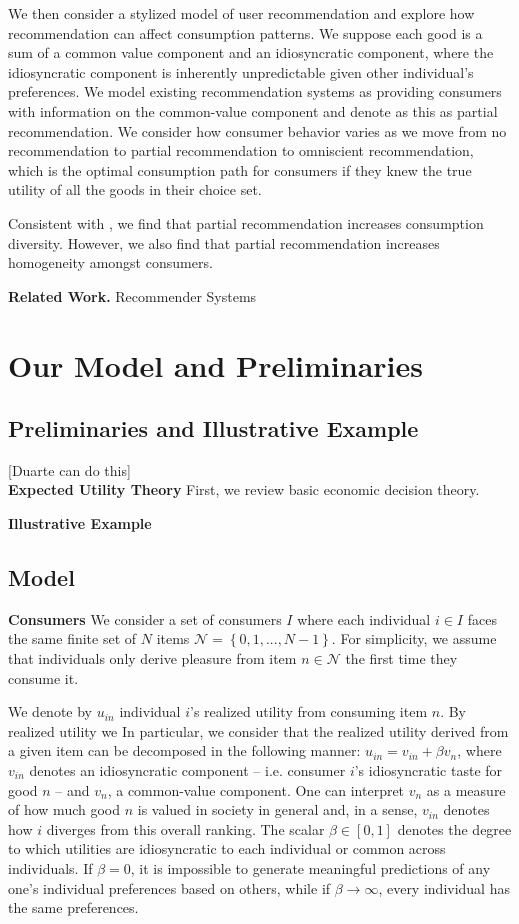 \documentclass[sigconf]{acmart}
\begin{document}
We then consider a stylized model of user recommendation and explore how recommendation can affect consumption patterns. We suppose each good is a sum of a common value component and an idiosyncratic component, where the idiosyncratic component is inherently unpredictable given other individual's preferences. We model existing recommendation systems as providing consumers with information on the common-value component and denote as this as partial recommendation. We consider how consumer behavior varies as we move from no recommendation to partial recommendation to omniscient recommendation, which is the optimal consumption path for consumers if they knew the true utility of all the goods in their choice set.

Consistent with \cite{nguyen2014exploring}, we find that partial recommendation increases consumption diversity. However, we also find that partial recommendation increases homogeneity amongst consumers. 

\textbf{Related Work.}
Recommender Systems

\section{Our Model and Preliminaries}

\subsection{Preliminaries and Illustrative Example}
[Duarte can do this] \\
\noindent \textbf{Expected Utility Theory} First, we review basic economic decision theory. 

\noindent \textbf{Illustrative Example}

\subsection{Model}
\par
\noindent \textbf{Consumers} We consider a set of consumers $I$ where each individual $i \in I$ faces the same finite set of $N$ items $\mathcal{N} = \left\{0,1,...,N-1\right\}$. For simplicity, we assume that individuals only derive pleasure from item $n \in \mathcal{N}$ the first time they consume it.

We denote by $u_{in}$ individual $i$'s realized utility from consuming item $n$. By realized utility we In particular, we consider that the realized utility derived from a given item can be decomposed in the following manner: $u_{in}= v_{in} + \beta v_n$, where $v_{in}$ denotes an idiosyncratic component -- i.e. consumer $i$'s idiosyncratic taste for good $n$ --  and $v_{n}$, a common-value component. One can interpret $v_n$ as a measure of how much good $n$ is valued in society in general and, in a sense, $v_{in}$ denotes how $i$ diverges from this overall ranking. The scalar $\beta \in [0,1]$ denotes the degree to which utilities are idiosyncratic to each individual or common across individuals. If $\beta=0$, it is impossible to generate meaningful predictions of any one's individual preferences based on others, while if $\beta \rightarrow \infty$, every individual has the same preferences.
\end{document}
